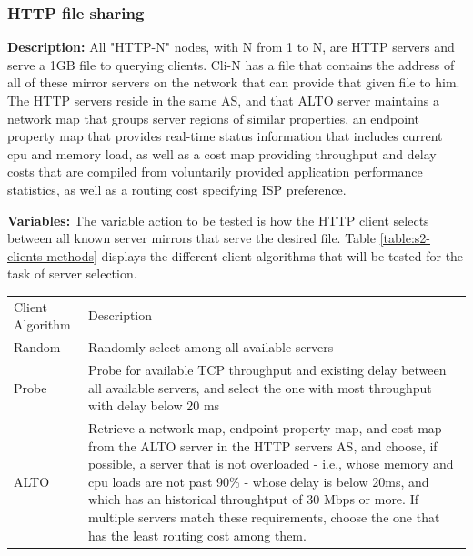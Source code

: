 \subsubsection{HTTP file sharing}

\textbf{Description: } All "HTTP-N" nodes, with N from 1 to N, are HTTP servers and serve a 1GB file to querying clients.
Cli-N has a file that contains the address of all of these mirror servers on the network that can provide that given file to him.
The HTTP servers reside in the same AS, and that ALTO server maintains a network map that groups server regions of similar properties, an endpoint property map that provides real-time status information that includes current cpu and memory load, as well as a cost map providing throughput and delay costs that are compiled from voluntarily provided application performance statistics, as well as a routing cost specifying ISP preference.

\textbf{Variables: } The variable action to be tested is how the HTTP client selects between all known server mirrors that serve the desired file.
Table \ref{table:s2-clients-methods} displays the different client algorithms that will be tested for the task of server selection.

\begin{table}[]
\begin{tabular}{ll}
Client Algorithm & Description                                                                                                                                                                                                \\
Random            & Randomly select among all available servers                                                                                                                                                                  \\
Probe             & Probe for available TCP throughput and existing delay between all available servers, and select the one with most throughput with delay below 20 ms
                                                             \\
ALTO              & Retrieve a network map, endpoint property map, and cost map from the ALTO server in the HTTP servers AS, and choose, if possible, a server that is not overloaded - i.e., whose memory and cpu loads are not past 90\% - whose delay is below 20ms, and which has an historical throughtput of 30 Mbps or more.
If multiple servers match these requirements, choose the one that has the least routing cost among them.
\end{tabular}
\label{table:s1-tracker-methods}
\end{table}

